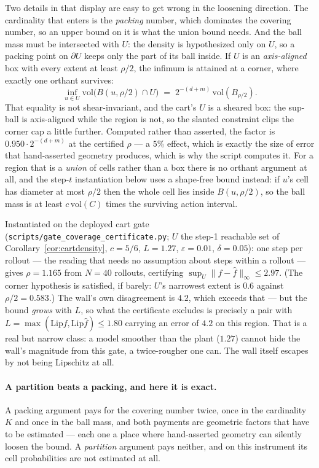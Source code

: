 \documentclass[11pt]{article}
\theoremstyle{definition}
\theoremstyle{remark}
\begin{document}
Two details in that display are easy to get wrong in the loosening direction. The cardinality that enters is the \emph{packing} number, which dominates the covering number, so an upper bound on it is what the union bound needs. And the ball mass must be intersected with $U$: the density is hypothesized only on $U$, so a packing point on $\partial U$ keeps only the part of its ball inside. If $U$ is an \emph{axis-aligned} box with every extent at least $\rho/2$, the infimum is attained at a corner, where exactly one orthant survives:
\[
  \inf_{u \in U}\mathrm{vol}\big(B(u,\rho/2) \cap U\big) \;=\; 2^{-(d+m)}\,\mathrm{vol}(B_{\rho/2}) .
\]
That equality is not shear-invariant, and the cart's $U$ is a sheared box: the sup-ball is axis-aligned while the region is not, so the slanted constraint clips the corner cap a little further. Computed rather than asserted, the factor is $0.950 \cdot 2^{-(d+m)}$ at the certified $\rho$ --- a $5\%$ effect, which is exactly the size of error that hand-asserted geometry produces, which is why the script computes it. For a region that is a \emph{union} of cells rather than a box there is no orthant argument at all, and the step-$t$ instantiation below uses a shape-free bound instead: if $u$'s cell has diameter at most $\rho/2$ then the whole cell lies inside $B(u,\rho/2)$, so the ball mass is at least $c\,\mathrm{vol}(C)$ times the surviving action interval.

Instantiated on the deployed cart gate (\texttt{scripts/\allowbreak gate\_\allowbreak coverage\_\allowbreak certificate.py}; $U$ the step-1 reachable set of Corollary~\ref{cor:cartdensity}, $c = 5/6$, $L = 1.27$, $\varepsilon = 0.01$, $\delta = 0.05$): one step per rollout --- the reading that needs no assumption about steps within a rollout --- gives $\rho = 1.165$ from $N = 40$ rollouts, certifying $\sup_U \|f - \hat f\|_\infty \leq 2.97$. (The corner hypothesis is satisfied, if barely: $U$'s narrowest extent is $0.6$ against $\rho/2 = 0.583$.) The wall's own disagreement is $4.2$, which exceeds that --- but the bound \emph{grows} with $L$, so what the certificate excludes is precisely a pair with $L = \max(\mathrm{Lip} f, \mathrm{Lip}\hat f) \leq 1.80$ carrying an error of $4.2$ on this region. That is a real but narrow class: a model smoother than the plant ($1.27$) cannot hide the wall's magnitude from this gate, a twice-rougher one can. The wall itself escapes by not being Lipschitz at all.

\paragraph{A partition beats a packing, and here it is exact.} A packing argument pays for the covering number twice, once in the cardinality $K$ and once in the ball mass, and both payments are geometric factors that have to be estimated --- each one a place where hand-asserted geometry can silently loosen the bound. A \emph{partition} argument pays neither, and on this instrument its cell probabilities are not estimated at all.
\end{document}
